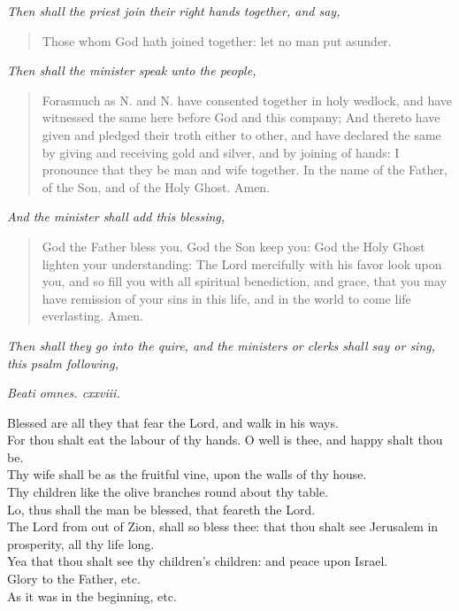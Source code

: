 \documentclass[
]{book}
\begin{document}
\begin{center}
\emph{Then shall the priest join their right hands together, and say,}

\end{center}

\begin{quote}
Those whom God hath joined together: let no man put asunder.
\end{quote}

\begin{center}
\emph{Then shall the minister speak unto the people,}

\end{center}

\begin{quote}
Forasmuch as N. and N. have consented together in holy wedlock, and have witnessed the same here before God and this company; And thereto have given and pledged their troth either to other, and have declared the same by giving and receiving gold and silver, and by joining of hands: I pronounce that they be man and wife together. In the name of the Father, of the Son, and of the Holy Ghost. Amen.
\end{quote}

\begin{center}
\emph{And the minister shall add this blessing,}

\end{center}

\begin{quote}
God the Father bless you. God the Son keep you: God the Holy Ghost lighten your understanding: The Lord mercifully with his favor look upon you, and so fill you with all spiritual benediction, and grace, that you may have remission of your sins in this life, and in the world to come life everlasting. Amen.
\end{quote}

\begin{center}
\emph{Then shall they go into the quire, and the ministers or clerks shall say or sing, this psalm following,}

\end{center}

\emph{Beati omnes. cxxviii.}

Blessed are all they that fear the Lord, and walk in his ways.\\
For thou shalt eat the labour of thy hands. O well is thee, and happy shalt thou be.\\
Thy wife shall be as the fruitful vine, upon the walls of thy house.\\
Thy children like the olive branches round about thy table.\\
Lo, thus shall the man be blessed, that feareth the Lord.\\
The Lord from out of Zion, shall so bless thee: that thou shalt see Jerusalem in prosperity, all thy life long.\\
Yea that thou shalt see thy children's children: and peace upon Israel.\\
Glory to the Father, etc.\\
As it was in the beginning, etc.
\end{document}
